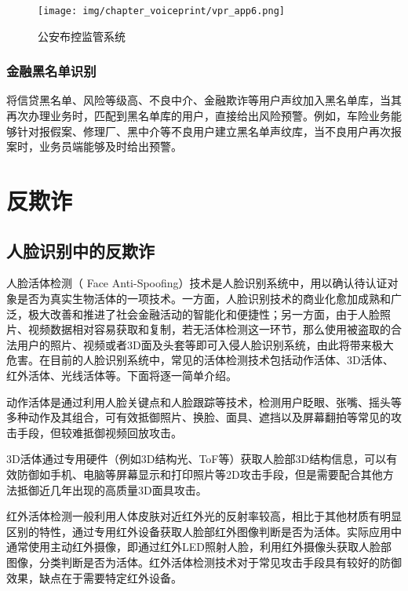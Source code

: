 \documentclass[graybox,envcountchap,sectrefs]{svmono}
\begin{document}
\begin{figure}[h!]
	\begin{center}
		\texttt{[image: img/chapter\_voiceprint/vpr\_app6.png]}
		\caption{公安布控监管系统}
		\label{pic:vprapp6}
	\end{center}
\end{figure}

\subsubsection{金融黑名单识别}
将信贷黑名单、风险等级高、不良中介、金融欺诈等用户声纹加入黑名单库，当其再次办理业务时，匹配到黑名单库的用户，直接给出风险预警。例如，车险业务能够针对报假案、修理厂、黑中介等不良用户建立黑名单声纹库，当不良用户再次报案时，业务员端能够及时给出预警。


\section{反欺诈}

\subsection{人脸识别中的反欺诈}

人脸活体检测（ Face Anti-Spoofing）技术是人脸识别系统中，用以确认待认证对象是否为真实生物活体的一项技术。一方面，人脸识别技术的商业化愈加成熟和广泛，极大改善和推进了社会金融活动的智能化和便捷性；另一方面，由于人脸照片、视频数据相对容易获取和复制，若无活体检测这一环节，那么使用被盗取的合法用户的照片、视频或者3D面及头套等即可入侵人脸识别系统，由此将带来极大危害\cite{chingovska2012effectiveness}。在目前的人脸识别系统中，常见的活体检测技术包括动作活体、3D活体、红外活体、光线活体等。下面将逐一简单介绍。

动作活体是通过利用人脸关键点和人脸跟踪等技术，检测用户眨眼、张嘴、摇头等多种动作及其组合，可有效抵御照片、换脸、面具、遮挡以及屏幕翻拍等常见的攻击手段，但较难抵御视频回放攻击。

3D活体通过专用硬件（例如3D结构光、ToF等）获取人脸部3D结构信息，可以有效防御如手机、电脑等屏幕显示和打印照片等2D攻击手段，但是需要配合其他方法抵御近几年出现的高质量3D面具攻击\cite{zhang2019dataset}。

红外活体检测一般利用人体皮肤对近红外光的反射率较高，相比于其他材质有明显区别的特性，通过专用红外设备获取人脸部红外图像判断是否为活体。实际应用中通常使用主动红外摄像，即通过红外LED照射人脸，利用红外摄像头获取人脸部图像，分类判断是否为活体。红外活体检测技术对于常见攻击手段具有较好的防御效果，缺点在于需要特定红外设备\cite{zhang2019dataset,yi2014face}。
\end{document}
